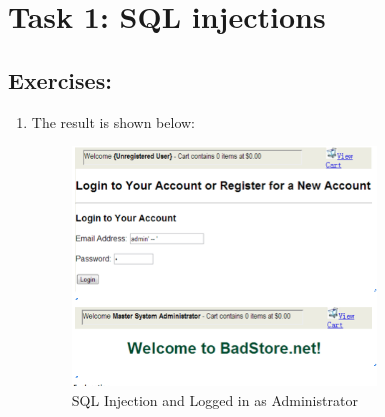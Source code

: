 \section*{Task 1: SQL injections}

\subsection*{Exercises:}
\begin{enumerate}
\item The result is shown below:

\begin{figure}[h!]
	\caption{SQL Injection and Logged in as Administrator}
	\centering \includegraphics[height=2.5in]{sqli1}
\end{figure}
  

\end{enumerate}

